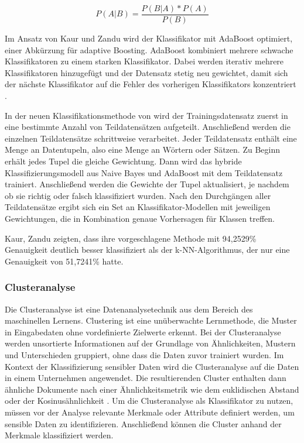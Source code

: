 \begin{equation}
    \label{e:naive-bayes}
    P(A|B) = \frac{P(B|A) * P(A)}{P(B)}
\end{equation}

Im Ansatz von Kaur und Zandu \cite{Kaur.2016} wird der Klassifikator mit AdaBoost optimiert, einer Abkürzung für adaptive Boosting. AdaBoost kombiniert mehrere schwache Klassifikatoren zu einem starken Klassifikator. Dabei werden iterativ mehrere Klassifikatoren hinzugefügt und der Datensatz stetig neu gewichtet, damit sich der nächste Klassifikator auf die Fehler des vorherigen Klassifikators konzentriert \cite{Frochte.2018c}.

In der neuen Klassifikationsmethode von \cite{Kaur.2016} wird der Trainingsdatensatz zuerst in eine bestimmte Anzahl von Teildatensätzen aufgeteilt. Anschließend werden die einzelnen Teildatensätze schrittweise verarbeitet. Jeder Teildatensatz enthält eine Menge an Datentupeln, also eine Menge an Wörtern oder Sätzen. Zu Beginn erhält jedes Tupel die gleiche Gewichtung. Dann wird das hybride Klassifizierungsmodell aus Naive Bayes und AdaBoost mit dem Teildatensatz trainiert. Anschließend werden die Gewichte der Tupel aktualisiert, je nachdem ob sie richtig oder falsch klassifiziert wurden. Nach den Durchgängen aller Teildatensätze ergibt sich ein Set an Klassifikator-Modellen mit jeweiligen Gewichtungen, die in Kombination genaue Vorhersagen für Klassen treffen.

Kaur, Zandu \cite{Kaur.2016} zeigten, dass ihre vorgeschlagene Methode mit 94,2529\% Genauigkeit deutlich besser klassifiziert als der k-NN-Algorithmus, der nur eine Genauigkeit von 51,7241\% hatte.

\subsubsection{Clusteranalyse}
Die Clusteranalyse ist eine Datenanalysetechnik aus dem Bereich des maschinellen Lernens. Clustering ist eine unüberwachte Lernmethode, die Muster in Eingabedaten ohne vordefinierte Zielwerte erkennt. Bei der Clusteranalyse werden unsortierte Informationen auf der Grundlage von Ähnlichkeiten, Mustern und Unterschieden gruppiert, ohne dass die Daten zuvor trainiert wurden. Im Kontext der Klassifizierung sensibler Daten wird die Clusteranalyse auf die Daten in einem Unternehmen angewendet. Die resultierenden Cluster enthalten dann ähnliche Dokumente nach einer Ähnlichkeitsmetrik wie dem euklidischen Abstand oder der Kosinusähnlichkeit \cite{Suyal.2014}.
Um die Clusteranalyse als Klassifikator zu nutzen, müssen vor der Analyse relevante Merkmale oder Attribute definiert werden, um sensible Daten zu identifizieren. Anschließend können die Cluster anhand der Merkmale klassifiziert werden.

